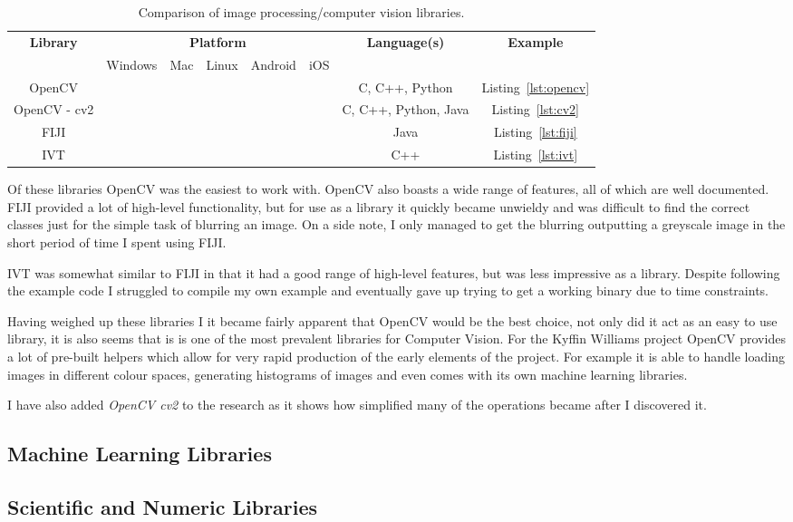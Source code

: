 \begin{table}[h]
\begin{tabular}{| c | c | c | c | c | c | c | c |}
								  \hline
\multirow{2}{*}{\textbf{Library}}	& \multicolumn{5}{|c|}{\textbf{Platform}}			& \multirow{2}{*}{\textbf{Language(s)}}	& \textbf{Example}	\\\cline{2-6}
					&  Windows	& Mac 		& Linux 	& Android	& iOS	&			&			\\\hline
OpenCV					& \checkmark	& \checkmark	& \checkmark	& 		& 	& C, C++, Python	& Listing~\ref{lst:opencv}\\\hline
OpenCV - cv2				& \checkmark	& \checkmark	& \checkmark	& \checkmark	& \checkmark & C, C++, Python, Java	& Listing~\ref{lst:cv2}\\\hline
FIJI					& \checkmark	& \checkmark	& \checkmark	& 		&	& Java			& Listing~\ref{lst:fiji}	\\\hline
IVT					& \checkmark	& \checkmark	& \checkmark	& 		&	& C++			& Listing~\ref{lst:ivt}	\\\hline
\end{tabular}
\caption{Comparison of image processing/computer vision libraries.}
\label{tab:libraries-overview}
\end{table}

Of these libraries OpenCV was the easiest to work with. OpenCV also boasts a wide range of 
features, all of which are well documented. FIJI provided a lot of high-level functionality, but
for use as a library it quickly became unwieldy and was difficult to find the correct classes just 
for the simple task of blurring an image. On a side note, I only managed to get the blurring 
outputting a greyscale image in the short period of time I spent using FIJI.

IVT was somewhat similar to FIJI in that it had a good range of high-level features, but was less
impressive as a library. Despite following the example code I struggled to compile my own example
and eventually gave up trying to get a working binary due to time constraints.


Having weighed up these libraries I it became fairly apparent that OpenCV would be the best choice,
not only did it act as an easy to use library, it is also seems that is is one of the most 
prevalent libraries for Computer Vision. For the Kyffin Williams project OpenCV provides a lot of
pre-built helpers which allow for very rapid production of the early elements of the project. For
example it is able to handle loading images in different colour spaces, generating histograms of
images and even comes with its own machine learning libraries.

I have also added \emph{OpenCV cv2} to the research as it shows how simplified many of the 
operations became after I discovered it.

\subsection{Machine Learning Libraries}

\subsection{Scientific and Numeric Libraries}


